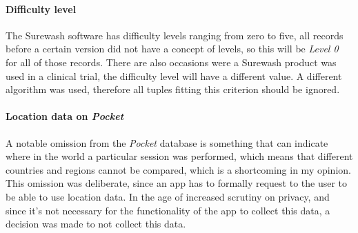             \paragraph{Difficulty level} The Surewash software has difficulty levels ranging from zero to five, all records before a certain version did not have a concept of levels, so this will be {\slshape Level 0} for all of those records. There are also occasions were a Surewash product was used in a clinical trial, the difficulty level will have a different value. A different algorithm was used, therefore all tuples fitting this criterion should be ignored.
            \paragraph{Location data on {\slshape Pocket}} A notable omission from the {\slshape Pocket} database is something that can indicate where in the world a particular session was performed, which means that different countries and regions cannot be compared, which is a shortcoming in my opinion. This omission was deliberate, since an app has to formally request to the user to be able to use location data. In the age of increased scrutiny on privacy, and since it's not necessary for the functionality of the app to collect this data, a decision was made to not collect this data.


